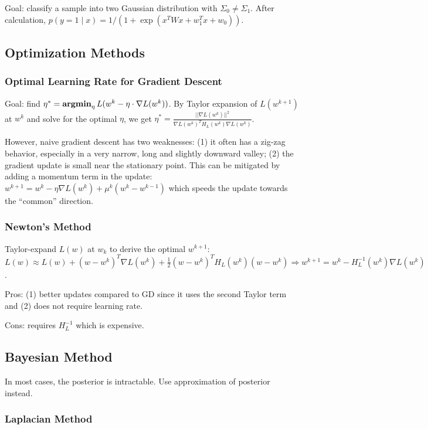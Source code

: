Goal: classify a sample into two Gaussian distribution with $\Sigma_0 \ne \Sigma_1$.
After calculation, $p(y=1\mid x) = 1/(1+\exp(x^T W x + w_1^T x +w_0))$.

\subsection*{Optimization Methods}

\subsubsection*{Optimal Learning Rate for Gradient Descent}

Goal: find $\eta^* = \operatorname{\textbf{argmin}}_\eta L(w^k - \eta\cdot \nabla L(w^k))$. By Taylor expansion of $L(w^{k+1})$ at $w^k$ and solve for the optimal $\eta$, we get $\eta^* = \frac{||\nabla L(w^k)||^2}{\nabla L(w^k)^T H_L(w^k) \nabla L(w^k)}$.

However, naive gradient descent has two weaknesses: (1) it often has a zig-zag behavior, especially in a very narrow, long and slightly downward valley; (2) the gradient update is small near the stationary point. This can be mitigated by adding a momentum term in the update: $w^{k+1} = w^k -\eta \nabla L(w^k) + \mu^k (w^k -w^{k-1})$ which speeds the update towards the ``common'' direction.

\subsubsection*{Newton's Method}

Taylor-expand $L(w)$ at $w_k$ to derive the optimal $w^{k+1}$: $L(w) \approx L(w) + (w-w^k)^T \nabla L(w^k) + \frac{1}{2}(w-w^k)^T H_L(w^k) (w-w^k) \Rightarrow w^{k+1} = w^k - H_L^{-1}(w^k)\nabla L(w^k)$. 

Pros: (1) better updates compared to GD since it uses the second Taylor term and (2) does not require learning rate.

Cons: requires $H_L^{-1}$ which is expensive.

\subsection*{Bayesian Method}

In most cases, the posterior is intractable. Use approximation of posterior instead.

\subsubsection*{Laplacian Method}

